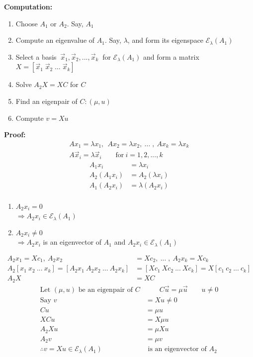 \documentclass[12pt, letterpaper]{article}
\begin{document}
\noindent \textbf{Computation:} 
\begin{enumerate}
    \item[0.] Choose $A_1$ or $A_2$. Say, $A_1$
    \item Compute an eigenvalue of $A_1$. Say, $\lambda$, and form its eigenspace $\mathcal{E}_\lambda(A_1)$
    \item Select a basis $\ \vec x_1,\vec x_2,...,\vec x_k\ $ for $\mathcal{E}_\lambda(A_1)$ and form a matrix $X=[\vec x_1\; \vec x_2\; \ldots\; \vec x_k]$
    \item Solve $A_2X=XC$ for $C$
    \item Find an eigenpair of $C:(\mu,u)$
    \item Compute $v=Xu$
\end{enumerate}
\newpage
\noindent \textbf{Proof:} 
\begin{align*}
    Ax_1=\lambda x_1,\ \ Ax_2=\lambda x_2,\ ...\; ,\ Ax_k=\lambda x_k \\
    A\vec x_i=\lambda \vec x_i\qquad\text{for}\ i=1,2,...,k 
\end{align*}
\begin{align*}
    A_1x_i &= \lambda x_i \\
    A_2(A_1x_i) &= A_2(\lambda x_i) \\
    A_1(A_2x_i) &= \lambda (A_2x_i) \tag{commutativity}\\
\end{align*}
\begin{enumerate}
    \item[Case 1:] $A_2x_i=0$ \\
                    $\Rightarrow A_2x_i \in \mathcal{E}_\lambda(A_1)$ 
    \item[Case 2:] $A_2x_i\ne0$ \\
                    $\Rightarrow A_2x_i$ is an eigenvector of $A_1$ and 
                    $A_2x_i \in \mathcal{E}_\lambda(A_1)$
\end{enumerate}
\begin{align*}
    A_2x_1=Xc_1,\ A_2x_2&=Xc_2,\ ...\; ,\ A_2x_k=Xc_k \\
    A_2[x_1\ x_2\ ...\ x_k]=[A_2x_1\ A_2x_2\ ...\ A_2x_k]&=[Xc_1\ Xc_2\ ...\ Xc_k]=X[c_1\ c_2\ ...\ c_k] \\
    A_2X&=XC 
\end{align*}
\begin{align*}    
    \text{Let } (\mu,u) \text{ be an eigenpair of } C & \qquad C\vec u=\mu \vec u \qquad u\ne 0 \\
    \text{Say } v&=Xu \ne 0 \\
    Cu &= \mu u \\
    XCu &= X\mu u \\
    A_2Xu &= \mu Xu \\
    A_2v &= \mu v \\
    \therefore v=Xu \in \mathcal{E}_\lambda(A_1) &\text{ is an eigenvector of } A_2
\end{align*}
\end{document}
